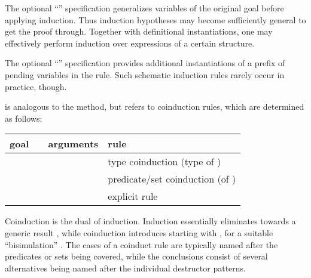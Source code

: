 \begin{isabellebody}
\begin{isamarkuptext}
\begin{descr}
  The optional ``''
  specification generalizes variables  of the original goal before applying induction.  Thus
  induction hypotheses may become sufficiently general to get the
  proof through.  Together with definitional instantiations, one may
  effectively perform induction over expressions of a certain
  structure.
  
  The optional ``''
  specification provides additional instantiations of a prefix of
  pending variables in the rule.  Such schematic induction rules
  rarely occur in practice, though.

  \item [\hyperlink{method.coinduct}{\mbox{\isa{coinduct}}}~\isa{{\isachardoublequote}inst\ R{\isachardoublequote}}] is analogous to the
  \hyperlink{method.induct}{\mbox{}} method, but refers to coinduction rules, which are
  determined as follows:

  \medskip
  \begin{tabular}{llll}
    goal          &                    & arguments & rule \\\hline
                  & \hyperlink{method.coinduct}{\mbox{\isa{coinduct}}} & \isa{x} & type coinduction (type of \isa{x}) \\
    \isa{{\isachardoublequote}A\ x{\isachardoublequote}} & \hyperlink{method.coinduct}{\mbox{\isa{coinduct}}} & \isa{{\isachardoublequote}{\isasymdots}{\isachardoublequote}} & predicate/set coinduction (of \isa{A}) \\
    \isa{{\isachardoublequote}{\isasymdots}{\isachardoublequote}}   & \hyperlink{method.coinduct}{\mbox{\isa{coinduct}}} & \isa{{\isachardoublequote}{\isasymdots}\ rule{\isacharcolon}\ R{\isachardoublequote}} & explicit rule \isa{R} \\
  \end{tabular}
  
  Coinduction is the dual of induction.  Induction essentially
  eliminates  towards a generic result ,
  while coinduction introduces  starting with , for a suitable ``bisimulation'' .  The cases of a
  coinduct rule are typically named after the predicates or sets being
  covered, while the conclusions consist of several alternatives being
  named after the individual destructor patterns.
  

\end{descr}
\end{isamarkuptext}
\end{isabellebody}
